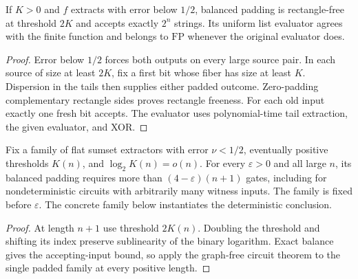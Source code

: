\begin{theorem}
  \label{thm:lowerbounds-algebraic-extractor-padding}
  \leanok
  If $K>0$ and $f$ extracts with error below $1/2$, balanced padding is
  rectangle-free at threshold $2K$ and accepts exactly $2^n$ strings.
  Its uniform list evaluator agrees with the finite function and belongs
  to $\mathrm{FP}$ whenever the original evaluator does.
\end{theorem}
\begin{proof}
  \leanok
  Error below $1/2$ forces both outputs on every large source pair.
  In each source of size at least $2K$, fix a first bit whose fiber has
  size at least $K$. Dispersion in the tails then supplies either padded
  outcome. Zero-padding complementary rectangle sides proves rectangle
  freeness. For each old input exactly one fresh bit accepts. The evaluator
  uses polynomial-time tail extraction, the given evaluator, and XOR.
\end{proof}

\begin{theorem}
  \label{thm:lowerbounds-algebraic-padded-hardness}
  \leanok
  Fix a family of flat sumset extractors with error $\nu<1/2$, eventually
  positive thresholds $K(n)$, and $\log_2 K(n)=o(n)$. For every
  $\varepsilon>0$ and all large $n$, its balanced padding requires more
  than $(4-\varepsilon)(n+1)$ gates, including for nondeterministic circuits
  with arbitrarily many witness inputs. The family is fixed before
  $\varepsilon$. The concrete family below instantiates the deterministic
  conclusion.
\end{theorem}
\begin{proof}
  \leanok
  At length $n+1$ use threshold $2K(n)$. Doubling the threshold and shifting
  its index preserve sublinearity of the binary logarithm. Exact balance
  gives the accepting-input bound, so apply the graph-free circuit theorem
  to the single padded family at every positive length.
\end{proof}

